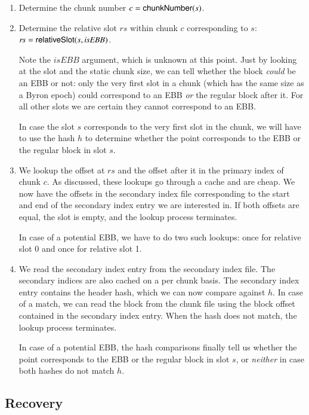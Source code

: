 \begin{enumerate}
\item Determine the chunk number $c = \mathsf{chunkNumber}(s)$.
\item Determine the relative slot $\mathit{rs}$ within chunk $c$ corresponding
  to $s$: $\mathit{rs} = \mathsf{relativeSlot}(s, \mathit{isEBB})$.

  Note the $\mathit{isEBB}$ argument, which is unknown at this point. Just by
  looking at the slot and the static chunk size, we can tell whether the block
  \emph{could} be an EBB or not: only the very first slot in a chunk (which has
  the same size as a Byron epoch) could correspond to an EBB \emph{or} the
  regular block after it. For all other slots we are certain they cannot
  correspond to an EBB.

  In case the slot $s$ corresponds to the very first slot in the chunk, we will
  have to use the hash $h$ to determine whether the point corresponds to the EBB
  or the regular block in slot $s$.
\item We lookup the offset at $\mathit{rs}$ and the offset after it in the
  primary index of chunk $c$. As discussed, these lookups go through a cache and
  are cheap. We now have the offsets in the secondary index file corresponding
  to the start and end of the secondary index entry we are interested in. If
  both offsets are equal, the slot is empty, and the lookup process terminates.

  In case of a potential EBB, we have to do two such lookups: once for relative
  slot 0 and once for relative slot 1.

\item We read the secondary index entry from the secondary index file. The
  secondary indices are also cached on a per chunk basis. The secondary index
  entry contains the header hash, which we can now compare against $h$. In case
  of a match, we can read the block from the chunk file using the block offset
  contained in the secondary index entry. When the hash does not match, the
  lookup process terminates.

  In case of a potential EBB, the hash comparisons finally tell us whether the
  point corresponds to the EBB or the regular block in slot $s$, or
  \emph{neither} in case both hashes do not match $h$.
\end{enumerate}

\subsection{Recovery}
\label{immutable:implementation:recovery}

